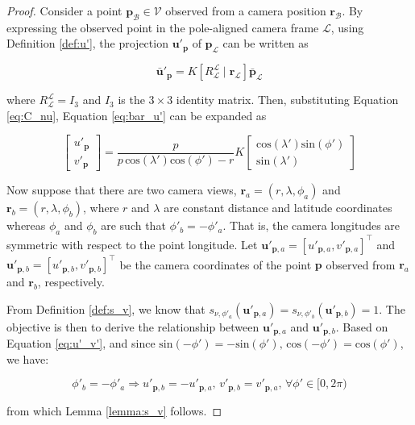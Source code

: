 \begin{proof}
    Consider a point $\mathbf{p}_\mathcal{B}\in\mathcal{V}$ observed from a camera position $\mathbf{r}_\mathcal{B}$. By expressing the observed point in the pole-aligned camera frame $\mathcal{L}$, using Definition \ref{def:u'}, the projection $\mathbf{u}'_\mathbf{p}$ of $\mathbf{p}_\mathcal{L}$ can be written as

\begin{equation}
\label{eq:bar_u'}
    \bar{\mathbf{u}}'_\mathbf{p} = K \left[ R^\mathcal{L}_\mathcal{L} \mid \mathbf{r}_\mathcal{L} \right]\bar{\mathbf{p}}_\mathcal{L}
\end{equation}

where $R^\mathcal{L}_\mathcal{L}=I_3$ and $I_3$ is the $3\times 3$ identity matrix. Then, substituting Equation \ref{eq:C_nu}, Equation \ref{eq:bar_u'} can be expanded as

\begin{equation}
\label{eq:u'_v'}
    \begin{bmatrix}
        u'_\mathbf{p} \\ v'_\mathbf{p}
    \end{bmatrix} =
    \dfrac{p}{p\,\mathrm{cos}(\lambda')\mathrm{cos}(\phi')-r}K
    \begin{bmatrix}
        \mathrm{cos}(\lambda')\mathrm{sin}(\phi')\\
        \mathrm{sin}(\lambda')
    \end{bmatrix}
\end{equation}

Now suppose that there are two camera views, $\mathbf{r}_a=(r,\lambda,\phi_a)$ and $\mathbf{r}_b=(r,\lambda,\phi_b)$, where $r$ and $\lambda$ are constant distance and latitude coordinates whereas $\phi_a$ and $\phi_b$ are such that $\phi'_b=-\phi'_a$. That is, the camera longitudes are symmetric with respect to the point longitude. Let $\mathbf{u}'_{\mathbf{p},a}=[u'_{\mathbf{p},a},v'_{\mathbf{p},a}]^\top$ and $\mathbf{u}'_{\mathbf{p},b}=[u'_{\mathbf{p},b},v'_{\mathbf{p},b}]^\top$ be the camera coordinates of the point $\mathbf{p}$ observed from $\mathbf{r}_a$ and $\mathbf{r}_b$, respectively. 

From Definition \ref{def:s_v}, we know that $s_{\nu,\phi'_a}(\mathbf{u}'_{\mathbf{p},a})=s_{\nu,\phi'_b}(\mathbf{u}'_{\mathbf{p},b})=1$. The objective is then to derive the relationship between $\mathbf{u}'_{\mathbf{p},a}$ and $\mathbf{u}'_{\mathbf{p},b}$. Based on Equation \ref{eq:u'_v'}, and since $\mathrm{sin}(-\phi')=-\mathrm{sin}(\phi'),\,\mathrm{cos}(-\phi')=\mathrm{cos}(\phi')$, we have:

\begin{equation}
    \phi'_b = -\phi'_a \Rightarrow u'_{\mathbf{p},b} = -u'_{\mathbf{p},a},\, v'_{\mathbf{p},b}=v'_{\mathbf{p},a},\, \forall \phi'\in[0,2\pi)
\end{equation}

from which Lemma \ref{lemma:s_v} follows.

\end{proof}

